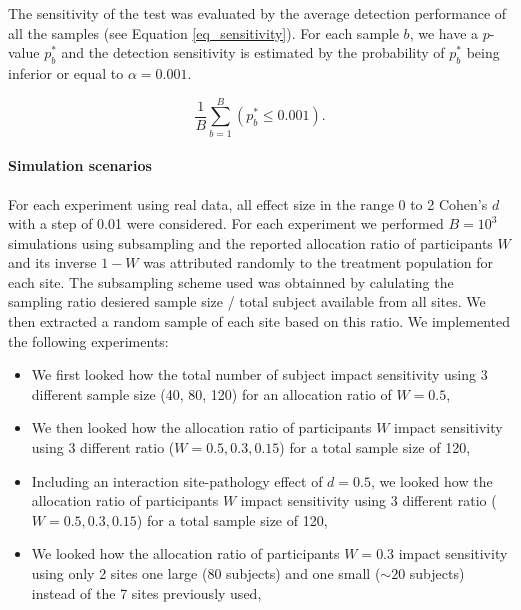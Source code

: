 \documentclass[authoryear]{elsarticle}
\begin{document}
The sensitivity of the test was evaluated by the average detection performance of all the samples (see Equation \ref{eq_sensitivity}). For each sample $b$, we have a $p$-value $p^{*}_b$ and the detection sensitivity is estimated by the probability of $p^{*}_b$ being inferior or equal to $\alpha=0.001$.

\begin{equation}
   \frac{1}{B}\sum\limits_{b=1}^B\left(p^{*}_b\leq0.001\right).
   \label{eq_sensitivity}
\end{equation}


\paragraph{Simulation scenarios}
For each experiment using real data, all effect size in the range 0 to 2 Cohen’s $d$ with a step of 0.01 were considered. For each experiment we performed $B=10^3$ simulations using subsampling and the reported allocation ratio of participants $W$ and its inverse $1-W$ was attributed randomly to the treatment population for each site. The subsampling scheme used was obtainned by calulating the sampling ratio desiered sample size / total subject available from all sites. We then extracted a random sample of each site based on this ratio. We implemented the following experiments:

\begin{itemize}
 \item We first looked how the total number of subject impact sensitivity using 3 different sample size (40, 80, 120) for an allocation ratio of $W=0.5$,
 \item We then looked how the allocation ratio of participants $W$ impact sensitivity using 3 different ratio ($W=0.5,0.3,0.15$) for a total sample size of 120,
 \item Including an interaction site-pathology effect of $d=0.5$, we looked how the allocation ratio of participants $W$ impact sensitivity using 3 different ratio ($W=0.5,0.3,0.15$) for a total sample size of 120,
 \item We looked how the allocation ratio of participants $W=0.3$ impact sensitivity using only 2 sites one large (80 subjects) and one small ($\sim20$ subjects) instead of the 7 sites previously used,
\end{itemize}
\end{document}
